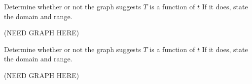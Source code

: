 \documentclass{ximera}
\begin{document}
\begin{problem}\label{graphfunctionfirsttT2}
    Determine whether or not the graph suggests $T$ is a function of $t$  If it does, state the domain and range.

    (NEED GRAPH HERE)
\end{problem} 



\begin{problem}\label{graphfunctionfirsttT3}
    Determine whether or not the graph suggests $T$ is a function of $t$  If it does, state the domain and range.

    (NEED GRAPH HERE)
\end{problem} 


\end{document}
